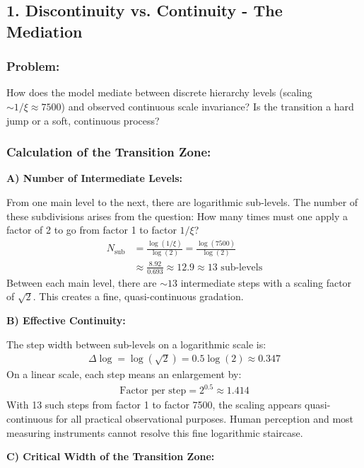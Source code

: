 	\subsection*{1. Discontinuity vs. Continuity - The Mediation}
	
	\subsubsection*{Problem:}
	How does the model mediate between discrete hierarchy levels (scaling $\sim 1/\xi \approx 7500$) and observed continuous scale invariance? Is the transition a hard jump or a soft, continuous process?
	
	\subsubsection*{Calculation of the Transition Zone:}
	
	\textbf{A) Number of Intermediate Levels:}
	
	From one main level to the next, there are logarithmic sub-levels. The number of these subdivisions arises from the question: How many times must one apply a factor of 2 to go from factor 1 to factor $1/\xi$?
	\begin{align*}
		N_{\text{sub}} &= \frac{\log(1/\xi)}{\log(2)} = \frac{\log(7500)}{\log(2)} \\
		&\approx \frac{8.92}{0.693} \approx 12.9 \approx 13 \text{ sub-levels}
	\end{align*}
	Between each main level, there are $\sim 13$ intermediate steps with a scaling factor of $\sqrt{2}$. This creates a fine, quasi-continuous gradation.
	
	\textbf{B) Effective Continuity:}
	
	The step width between sub-levels on a logarithmic scale is:
	\begin{align*}
		\Delta \log = \log(\sqrt{2}) = 0.5 \log(2) \approx 0.347
	\end{align*}
	On a linear scale, each step means an enlargement by:
	\begin{align*}
		\text{Factor per step} = 2^{0.5} \approx 1.414
	\end{align*}
	With 13 such steps from factor 1 to factor 7500, the scaling appears quasi-continuous for all practical observational purposes. Human perception and most measuring instruments cannot resolve this fine logarithmic staircase.
	
	\textbf{C) Critical Width of the Transition Zone:}
	
